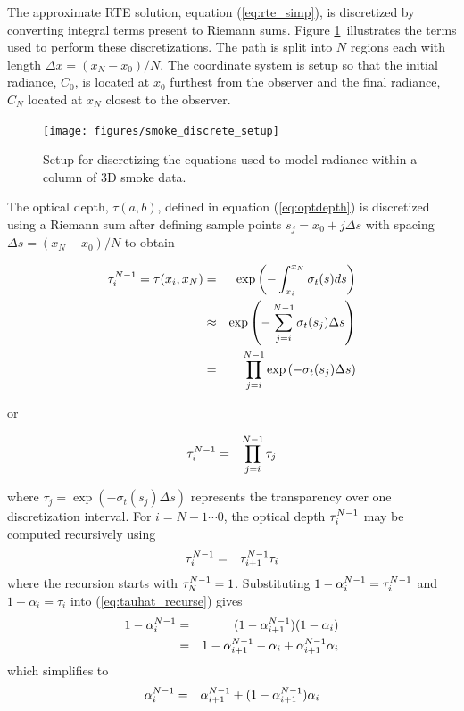 The approximate RTE solution, equation (\ref{eq:rte_simp}), is discretized by converting integral terms present to Riemann sums. Figure \ref{fig:smokediscretesetup}\ illustrates the terms used to perform these discretizations.  The path is split into $N$ regions each with length $\Delta x=(x_N-x_0)/N$.  The coordinate system is setup so that the initial radiance, $C_0$, is located at $x_0$ furthest from the observer and the final radiance, $C_N$ located at $x_N$ closest to the observer.

\begin{figure}[\figoptions]
\begin{center}
\texttt{[image: figures/smoke\_discrete\_setup]}
\end{center}
\caption {Setup for discretizing the equations used to model
radiance within a column of 3D smoke data.}
\label{fig:smokediscretesetup}
\end{figure}

The optical depth, $\tau(a,b)$, defined in equation (\ref{eq:optdepth}) is discretized using a Riemann sum  after defining sample points $s_j=x_0+j\Delta s$ with spacing $\Delta s=(x_N-x_0)/N$ to obtain

\begin{eqnarray*}
\tau_{i}^{N-1}=\tau(x_i,x_N)&=&\exp\left(-\int_{x_i}^{x_N}\sigma_t(s)ds\right)\\
&\approx&\exp\left(-\sum_{j=i}^{N-1}\sigma_t(s_j)\Delta s\right)\\
&=&\prod_{j=i}^{N-1}\exp\left(-\sigma_t(s_j)\Delta s\right)
\end{eqnarray*}

or

\begin{eqnarray*}
\tau_{i}^{N-1}&=&\prod_{j=i}^{N-1}\tau_j
\end{eqnarray*}

where $\tau_j=\exp\left(-\sigma_t(s_j)\Delta s\right)$ represents the transparency over one discretization interval.
For $i=N-1\cdots 0$, the optical depth $\tau_{i}^{N-1}$ may be computed recursively using
\begin{eqnarray}
\label{eq:tauhat_recurse}
\tau_{i}^{N-1}&=&\tau_{i+1}^{N-1}\tau_i
\end{eqnarray}
where the recursion starts with $\tau_{N}^{N-1}=1$.
Substituting $1-\alpha_{i}^{N-1}=\tau_{i}^{N-1}$ and $1-\alpha_i=\tau_i$ into (\ref{eq:tauhat_recurse}) gives
\begin{eqnarray*}
1-\alpha_{i}^{N-1}&=&(1-\alpha_{i+1}^{N-1})(1-\alpha_i)\\
&=&1-\alpha_{i+1}^{N-1} - \alpha_i + \alpha_{i+1}^{N-1}\alpha_i
\end{eqnarray*}
which simplifies to
\begin{eqnarray}
\label{eq:alpha2}
\alpha_{i}^{N-1}&=&\alpha_{i+1}^{N-1} + (1-\alpha_{i+1}^{N-1})\alpha_i
\end{eqnarray}

